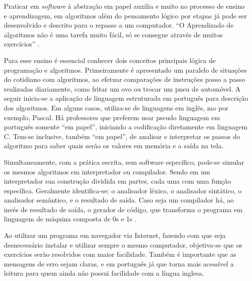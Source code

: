 \ifdraft{\color{green}}{}Praticar em \textit{software} à abstração em papel auxilia e muito no processo de ensino e aprendizagem, em algoritmos além do pensamento lógico por etapas já pode ser desenvolvido e descrito para o repasse a um computador.
``O Aprendizado de algoritmos não é uma tarefa muito fácil, só se consegue através de muitos exercícios'' \cite[p.~1]{lopes2002etal}.

Para esse ensino é essencial conhecer dois conceitos principais lógica de programação e algoritmos. Primeiramente é apresentado um paralelo de situações do cotidiano com algoritmos, ao efetuar comparações de instruções passo a passo realizadas diariamente, como fritar um ovo ou trocar um pneu de automóvel. A seguir inicia-se a aplicação de linguagem estruturada em português para descrição dos algoritmos. Em alguns casos, utiliza-se de linguagens em inglês, mo por exemplo, Pascal. Há professores que preferem usar pseudo linguagem em português somente ``em papel'', iniciando a codificação diretamente em linguagem C. Tem-se inclusive, também ``em papel'', de analisar e interpretar os passos do algoritmo para saber quais serão os valores em memória e a saída na tela.

Simultaneamente, com a prática escrita, sem software específico, pode-se simular os mesmos algoritmos em interpretador ou compilador. Sendo em um interpretador sua construção dividida em partes, cada uma com uma função específica. Geralmente identifica-se: o analisador léxico, o analisador sintático, o analisador semântico, e o resultado de saída. Caso seja um compilador há, ao invés de resultado de saída, o gerador de código, que transforma o programa em linguagem de máquina composta de 0s e 1s \cite{delamaro2004}.

Ao utilizar um programa em navegador via Internet, fazendo com que seja desnecessário instalar e utilizar sempre o mesmo computador, objetiva-se que os exercícios serão resolvidos com maior facilidade. Também é importante que as mensagens de erro sejam claras, e em português já que torna mais acessível a leitura para quem ainda não possui facilidade com a língua inglesa.\color{black}
